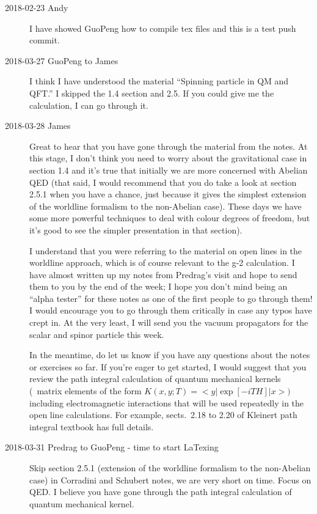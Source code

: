 \begin{description}
\item[2018-02-23 Andy] I have showed GuoPeng how to compile tex files and
this is a test push commit.

\item[2018-03-27 GuoPeng to James]
I think I have understood the material ``Spinning particle in QM and QFT.'' I
skipped the 1.4 section and 2.5. If you could give me the calculation,  I can
go through it.

\item[2018-03-28 James]
Great to hear that you have gone through the material from the notes. At this
stage, I don't think you need to worry about the gravitational case in section
1.4 and it's true that initially we are more concerned with Abelian QED (that
said, I would recommend that you do take a look at section 2.5.1 when you have
a chance, just because it gives the simplest extension of the worldline
formalism to the non-Abelian case). These days we have some more powerful
techniques to deal with colour degrees of freedom, but it's good to see the
simpler presentation in that section).

I understand that you were referring to the material on open lines in the
worldline approach, which is of course relevant to the g-2 calculation. I have
almost written up my notes from Predrag's visit and hope to send them to you by
the end of the week; I hope you don't mind being an ``alpha tester'' for these
notes as one of the first people to go through them! I would encourage you to
go through them critically in case any typos have crept in. At the very least,
I will send you the vacuum propagators for the scalar and spinor particle this
week.

In the meantime, do let us know if you have any questions about the notes or
exercises so far. If you're eager to get started, I would suggest that you
review the path integral calculation of quantum mechanical kernels (\ie\ matrix
elements of the form $K(x, y; T) = <y | \exp[-i T H] | x>)$ including
electromagnetic interactions that will be used repeatedly in the open line
calculations. For example, sects.~2.18 to 2.20 of Kleinert path
integral textbook has full details.

\item[2018-03-31 Predrag to GuoPeng - time to start LaTexing]
Skip section 2.5.1 (extension of the worldline formalism to the non-Abelian
case) in Corradini and Schubert notes, we are very short on time.
Focus on QED. I believe you have gone through the path integral calculation of
quantum mechanical kernel.


\end{description}
